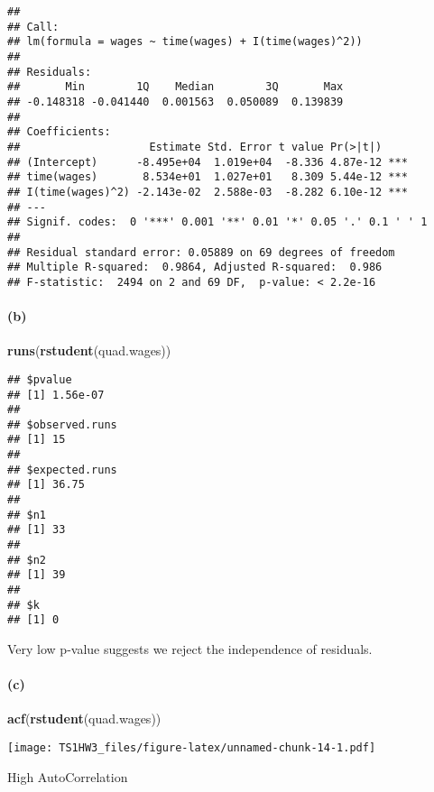 \documentclass[
]{article}
\newenvironment{Shaded}{\begin{snugshade}}{\end{snugshade}}
\newcommand{\FunctionTok}[1]{\textcolor[rgb]{0.13,0.29,0.53}{\textbf{#1}}}
\newcommand{\NormalTok}[1]{#1}
\begin{document}
\begin{verbatim}
## 
## Call:
## lm(formula = wages ~ time(wages) + I(time(wages)^2))
## 
## Residuals:
##       Min        1Q    Median        3Q       Max 
## -0.148318 -0.041440  0.001563  0.050089  0.139839 
## 
## Coefficients:
##                    Estimate Std. Error t value Pr(>|t|)    
## (Intercept)      -8.495e+04  1.019e+04  -8.336 4.87e-12 ***
## time(wages)       8.534e+01  1.027e+01   8.309 5.44e-12 ***
## I(time(wages)^2) -2.143e-02  2.588e-03  -8.282 6.10e-12 ***
## ---
## Signif. codes:  0 '***' 0.001 '**' 0.01 '*' 0.05 '.' 0.1 ' ' 1
## 
## Residual standard error: 0.05889 on 69 degrees of freedom
## Multiple R-squared:  0.9864, Adjusted R-squared:  0.986 
## F-statistic:  2494 on 2 and 69 DF,  p-value: < 2.2e-16
\end{verbatim}

\hypertarget{b}{%
\paragraph{(b)}\label{b}}

\begin{Shaded}
\begin{Highlighting}[]
\FunctionTok{runs}\NormalTok{(}\FunctionTok{rstudent}\NormalTok{(quad.wages))}
\end{Highlighting}
\end{Shaded}

\begin{verbatim}
## $pvalue
## [1] 1.56e-07
## 
## $observed.runs
## [1] 15
## 
## $expected.runs
## [1] 36.75
## 
## $n1
## [1] 33
## 
## $n2
## [1] 39
## 
## $k
## [1] 0
\end{verbatim}

Very low p-value suggests we reject the independence of residuals.

\hypertarget{c}{%
\paragraph{(c)}\label{c}}

\begin{Shaded}
\begin{Highlighting}[]
\FunctionTok{acf}\NormalTok{(}\FunctionTok{rstudent}\NormalTok{(quad.wages))}
\end{Highlighting}
\end{Shaded}

\texttt{[image: TS1HW3\_files/figure-latex/unnamed-chunk-14-1.pdf]}

High AutoCorrelation
\end{document}
